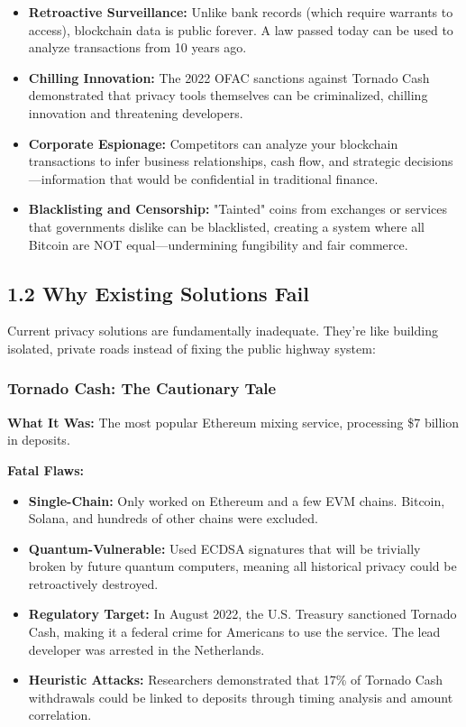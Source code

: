 \documentclass[11pt,a4paper]{article}
\begin{document}
\begin{itemize}
    \item \textbf{Retroactive Surveillance:} Unlike bank records (which require warrants to access), blockchain data is public forever. A law passed today can be used to analyze transactions from 10 years ago.

    \item \textbf{Chilling Innovation:} The 2022 OFAC sanctions against Tornado Cash demonstrated that privacy tools themselves can be criminalized, chilling innovation and threatening developers.

    \item \textbf{Corporate Espionage:} Competitors can analyze your blockchain transactions to infer business relationships, cash flow, and strategic decisions—information that would be confidential in traditional finance.

    \item \textbf{Blacklisting and Censorship:} "Tainted" coins from exchanges or services that governments dislike can be blacklisted, creating a system where all Bitcoin are NOT equal—undermining fungibility and fair commerce.
\end{itemize}

\subsection{1.2 Why Existing Solutions Fail}

Current privacy solutions are fundamentally inadequate. They're like building isolated, private roads instead of fixing the public highway system:

\subsubsection{Tornado Cash: The Cautionary Tale}

\textbf{What It Was:} The most popular Ethereum mixing service, processing \$7 billion in deposits.

\textbf{Fatal Flaws:}
\begin{itemize}
    \item \textbf{Single-Chain:} Only worked on Ethereum and a few EVM chains. Bitcoin, Solana, and hundreds of other chains were excluded.

    \item \textbf{Quantum-Vulnerable:} Used ECDSA signatures that will be trivially broken by future quantum computers, meaning all historical privacy could be retroactively destroyed.

    \item \textbf{Regulatory Target:} In August 2022, the U.S. Treasury sanctioned Tornado Cash, making it a federal crime for Americans to use the service. The lead developer was arrested in the Netherlands.

    \item \textbf{Heuristic Attacks:} Researchers demonstrated that 17\% of Tornado Cash withdrawals could be linked to deposits through timing analysis and amount correlation.
\end{itemize}
\end{document}
